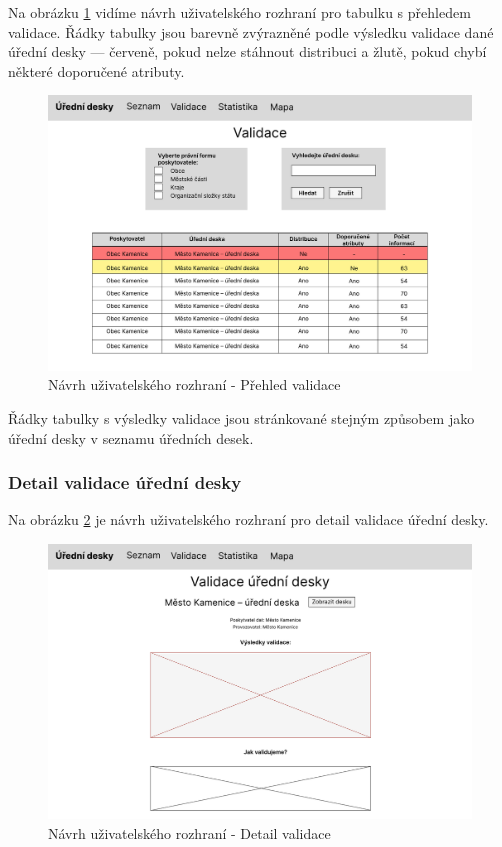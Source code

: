 Na obrázku \ref{fig:validace} vidíme návrh uživatelského rozhraní pro tabulku s přehledem validace. Řádky tabulky jsou barevně zvýrazněné podle výsledku validace dané úřední desky --- červeně, pokud nelze stáhnout distribuci a žlutě, pokud chybí některé doporučené atributy.

\begin{figure} 
\includegraphics[width=\textwidth, frame]{cs/obrazky/wireframes/wireframe_validace.pdf}
\caption{Návrh uživatelského rozhraní - Přehled validace}
\label{fig:validace}
\end{figure}

Řádky tabulky s výsledky validace jsou stránkované stejným způsobem jako úřední desky v seznamu úředních desek.

\subsubsection{Detail validace úřední desky}

Na obrázku \ref{fig:validace-detail} je návrh uživatelského rozhraní pro detail validace úřední desky.

\begin{figure} 
\includegraphics[width=\textwidth, frame]{cs/obrazky/wireframes/wireframe_validace_detail.pdf}
\caption{Návrh uživatelského rozhraní - Detail validace}
\label{fig:validace-detail}
\end{figure}

